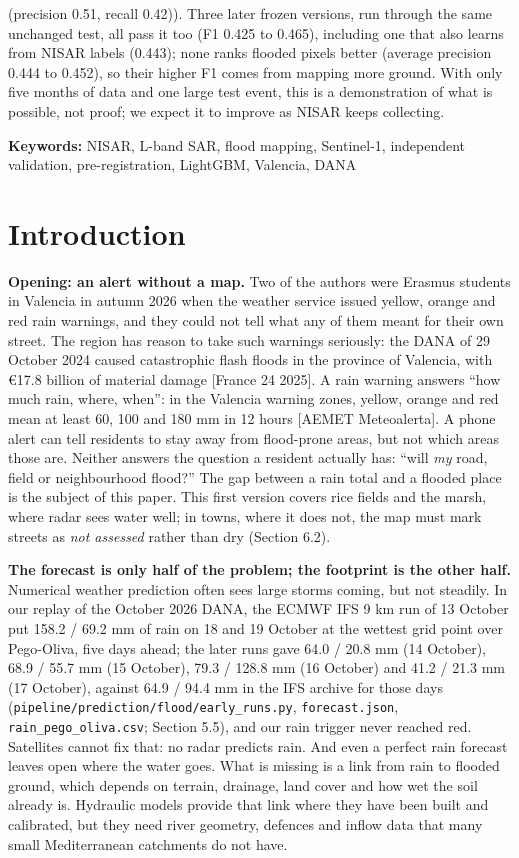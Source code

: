 \documentclass[10pt,twocolumn]{article}
\begin{document}
(precision 0.51, recall 0.42)). Three later frozen versions, run through the same unchanged test, all pass it too (F1 0.425 to 0.465), including one that also learns from NISAR labels (0.443); none ranks flooded pixels better (average precision 0.444 to 0.452), so their higher F1 comes from mapping more ground. With only five months of data and one large test event, this is a demonstration of what is possible, not proof; we expect it to improve as NISAR keeps collecting.

\textbf{Keywords:} NISAR, L-band SAR, flood mapping, Sentinel-1, independent validation, pre-registration, LightGBM, Valencia, DANA

\section{Introduction}
\textbf{Opening: an alert without a map.} Two of the authors were Erasmus students in Valencia in autumn 2026 when the weather service issued yellow, orange and red rain warnings, and they could not tell what any of them meant for their own street. The region has reason to take such warnings seriously: the DANA of 29 October 2024 caused catastrophic flash floods in the province of Valencia, with €17.8 billion of material damage [France 24 2025]. A rain warning answers ``how much rain, where, when'': in the Valencia warning zones, yellow, orange and red mean at least 60, 100 and 180 mm in 12 hours [AEMET Meteoalerta]. A phone alert can tell residents to stay away from flood-prone areas, but not which areas those are. Neither answers the question a resident actually has: ``will \emph{my} road, field or neighbourhood flood?'' The gap between a rain total and a flooded place is the subject of this paper. This first version covers rice fields and the marsh, where radar sees water well; in towns, where it does not, the map must mark streets as \emph{not assessed} rather than dry (Section 6.2).

\textbf{The forecast is only half of the problem; the footprint is the other half.} Numerical weather prediction often sees large storms coming, but not steadily. In our replay of the October 2026 DANA, the ECMWF IFS 9 km run of 13 October put 158.2 / 69.2 mm of rain on 18 and 19 October at the wettest grid point over Pego-Oliva, five days ahead; the later runs gave 64.0 / 20.8 mm (14 October), 68.9 / 55.7 mm (15 October), 79.3 / 128.8 mm (16 October) and 41.2 / 21.3 mm (17 October), against 64.9 / 94.4 mm in the IFS archive for those days (\texttt{pipeline/\allowbreak{}prediction/\allowbreak{}flood/\allowbreak{}early\_\allowbreak{}runs.\allowbreak{}py}, \texttt{forecast.\allowbreak{}json}, \texttt{rain\_\allowbreak{}pego\_\allowbreak{}oliva.\allowbreak{}csv}; Section 5.5), and our rain trigger never reached red. Satellites cannot fix that: no radar predicts rain. And even a perfect rain forecast leaves open where the water goes. What is missing is a link from rain to flooded ground, which depends on terrain, drainage, land cover and how wet the soil already is. Hydraulic models provide that link where they have been built and calibrated, but they need river geometry, defences and inflow data that many small Mediterranean catchments do not have.
\end{document}

